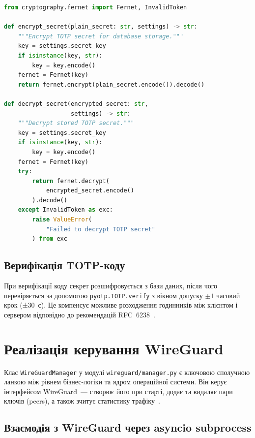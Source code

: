 \begin{lstlisting}[style=mystyle, language=Python,
  caption={Шифрування TOTP-секрету за допомогою Fernet},
  label={lst:totp_encrypt}]
from cryptography.fernet import Fernet, InvalidToken

def encrypt_secret(plain_secret: str, settings) -> str:
    """Encrypt TOTP secret for database storage."""
    key = settings.secret_key
    if isinstance(key, str):
        key = key.encode()
    fernet = Fernet(key)
    return fernet.encrypt(plain_secret.encode()).decode()

def decrypt_secret(encrypted_secret: str,
                   settings) -> str:
    """Decrypt stored TOTP secret."""
    key = settings.secret_key
    if isinstance(key, str):
        key = key.encode()
    fernet = Fernet(key)
    try:
        return fernet.decrypt(
            encrypted_secret.encode()
        ).decode()
    except InvalidToken as exc:
        raise ValueError(
            "Failed to decrypt TOTP secret"
        ) from exc
\end{lstlisting}

\subsection{Верифікація TOTP-коду}

При верифікації коду секрет розшифровується з бази даних, після чого
перевіряється за допомогою \texttt{pyotp.TOTP.verify} з вікном допуску
$\pm 1$ часовий крок (±30~с). Це компенсує можливе
розходження годинників між клієнтом і сервером відповідно до рекомендацій
RFC~6238~\cite{rfc6238}.

\section{Реалізація керування WireGuard}
\label{sec:wireguard_implementation}

Клас \texttt{WireGuardManager} у модулі \texttt{wireguard/manager.py} є
ключовою сполучною ланкою між рівнем бізнес-логіки та ядром операційної
системи. Він керує інтерфейсом WireGuard~--- створює його при старті,
додає та видаляє пари ключів (peers), а також зчитує статистику
трафіку~\cite{donenfeld2017wireguard}.

\subsection{Взаємодія з WireGuard через asyncio subprocess}

